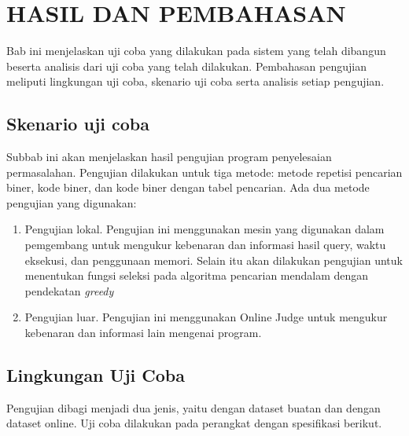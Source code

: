 \chapter{HASIL DAN PEMBAHASAN}

Bab ini menjelaskan uji coba yang dilakukan pada sistem yang telah dibangun beserta analisis dari uji coba yang telah dilakukan. Pembahasan pengujian meliputi lingkungan uji coba, skenario uji coba serta analisis setiap pengujian.


\section{Skenario uji coba}

Subbab ini akan menjelaskan hasil pengujian program penyelesaian permasalahan. Pengujian dilakukan untuk tiga metode: metode repetisi pencarian biner, kode biner, dan kode biner dengan tabel pencarian. Ada dua metode pengujian yang digunakan:

\begin{enumerate}
  \item Pengujian lokal. Pengujian ini menggunakan mesin yang digunakan dalam pemgembang untuk mengukur kebenaran dan informasi hasil query, waktu eksekusi, dan penggunaan memori. Selain itu akan dilakukan pengujian untuk menentukan fungsi seleksi pada algoritma pencarian mendalam dengan pendekatan \textit{greedy}
  \item Pengujian luar. Pengujian ini menggunakan Online Judge untuk mengukur kebenaran dan informasi lain mengenai program.
\end{enumerate}

\section{Lingkungan Uji Coba}

Pengujian dibagi menjadi dua jenis, yaitu dengan dataset buatan dan dengan dataset online. Uji coba dilakukan pada perangkat dengan spesifikasi berikut.


